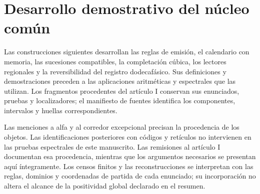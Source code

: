 \section*{Desarrollo demostrativo del núcleo común}

Las construcciones siguientes desarrollan las reglas de emisión, el calendario
con memoria, las sucesiones compatibles, la completación cúbica, los lectores
regionales y la reversibilidad del registro dodecafásico. Sus definiciones y
demostraciones preceden a las aplicaciones aritméticas y espectrales que las
utilizan. Los fragmentos procedentes del artículo I conservan sus enunciados,
pruebas y localizadores; el manifiesto de fuentes identifica los componentes,
intervalos y huellas correspondientes.

Las menciones a alfa y al corredor excepcional precisan la procedencia de los
objetos. Las identificaciones posteriores con códigos y retículos no intervienen
en las pruebas espectrales de este manuscrito. Las remisiones al artículo I
documentan esa procedencia, mientras que los argumentos necesarios se presentan
aquí íntegramente. Los censos finitos y las reconstrucciones se interpretan con
las reglas, dominios y coordenadas de partida de cada enunciado; su incorporación
no altera el alcance de la positividad global declarado en el resumen.

\clearpage




\clearpage


\clearpage
\clearpage


\clearpage


\clearpage

